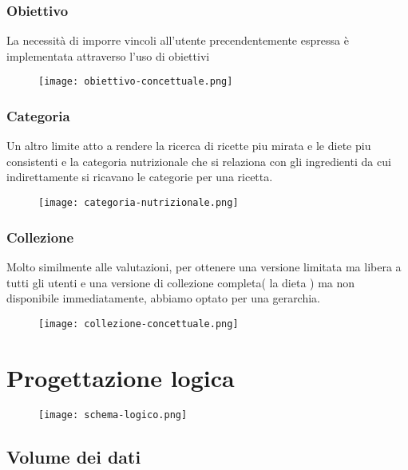 ﻿\documentclass[a4paper,12pt]{report}
\begin{document}
\subsection{Obiettivo}
La necessità di imporre vincoli all'utente precendentemente espressa
è implementata attraverso l'uso di obiettivi
\begin{figure}[H]
    \centering
    \texttt{[image: obiettivo-concettuale.png]}
\end{figure}
\subsection{Categoria}
Un altro limite atto a rendere la ricerca di ricette
piu mirata e le diete piu consistenti e la categoria nutrizionale
che si relaziona con gli ingredienti da cui indirettamente si ricavano le categorie
per una ricetta.
\begin{figure}[H]
    \centering
    \texttt{[image: categoria-nutrizionale.png]}
\end{figure}
\subsection{Collezione}
Molto similmente alle valutazioni, per ottenere una versione limitata
ma libera a tutti gli utenti e una versione di collezione completa( la dieta )
ma non disponibile immediatamente, abbiamo optato per una gerarchia.
\begin{figure}[H]
    \centering
    \texttt{[image: collezione-concettuale.png]}
\end{figure}
\chapter{Progettazione logica}
\begin{figure}[H]
    \centering
    \texttt{[image: schema-logico.png]}
\end{figure}
\section{Volume dei dati}
      
\end{document}
